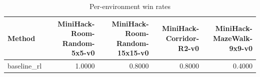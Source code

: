 \begin{table}[htbp]
\centering
\caption{Per-environment win rates}
\label{tab:per-env}
\begin{tabular}{lrrrr}
\toprule
\textbf{Method} & \textbf{MiniHack-Room-Random-5x5-v0} & \textbf{MiniHack-Room-Random-15x15-v0} & \textbf{MiniHack-Corridor-R2-v0} & \textbf{MiniHack-MazeWalk-9x9-v0} \\
\midrule
baseline\_rl & 1.0000 & 0.8000 & 0.8000 & 0.4000 \\
\bottomrule
\end{tabular}
\end{table}